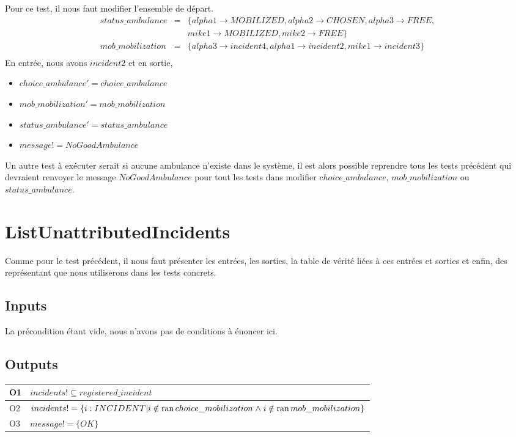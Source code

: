 \documentclass{report}
\begin{document}
Pour ce test, il nous faut modifier l'ensemble de départ.
\begin{eqnarray*}
status\_ambulance &=& \{alpha1 \rightarrow MOBILIZED, alpha2 \rightarrow CHOSEN, alpha3 \rightarrow FREE, \\ 
	&& mike1 \rightarrow MOBILIZED, mike2 \rightarrow FREE\} \\
mob\_mobilization &=& \{alpha3 \rightarrow incident4, alpha1 \rightarrow incident2, mike1 \rightarrow incident3\} \\
\end{eqnarray*}
En entrée, nous avons $incident2$ et en sortie, 
\begin{itemize}
	\item $choice\_ambulance' = choice\_ambulance$
	\item $mob\_mobilization' = mob\_mobilization$
	\item $status\_ambulance' = status\_ambulance$
	\item $message! = NoGoodAmbulance$
\end{itemize}

Un autre test à exécuter serait si aucune ambulance n'existe dans 
le système, il est alors possible reprendre tous les tests
précédent qui devraient renvoyer le message $NoGoodAmbulance$ pour tout
les tests dans modifier $choice\_ambulance$, $mob\_mobilization$ ou 
$status\_ambulance$.

\section{ListUnattributedIncidents}

Comme pour le test précédent, il nous faut présenter les entrées,
les sorties, la table de vérité liées à ces entrées et sorties et enfin, 
des représentant que nous utiliserons dans les tests concrets.

\subsection{Inputs}

La précondition étant vide, nous n'avons pas de conditions à énoncer ici.

\subsection{Outputs}

\noindent\begin{minipage}{\marginparsep+\marginparwidth+\marginparpush+\textwidth}
\begin{tabularx}{\textwidth}{|l|X|}
	\hline
	O1 & $incidents! \subseteq registered\_incident$ \\ \hline
	O2 & $incidents! = \{ i : INCIDENT | i \notin \mathop{\mathrm{ran}} choice\_mobilization \mathrel{\wedge} i \notin \mathop{\mathrm{ran}} mob\_mobilization \}$ \\ \hline
	O3 & $message! = \{OK\}$ \\ \hline
  	\hline
\end{tabularx}
\end{minipage}
\end{document}
